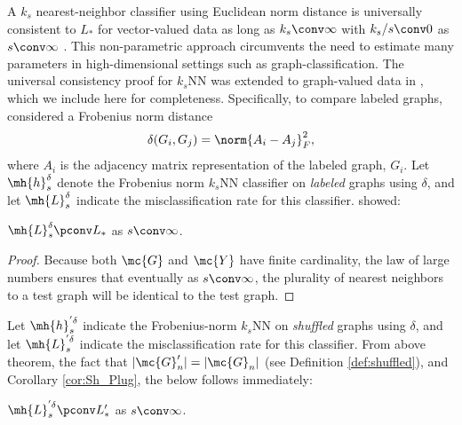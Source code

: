 \documentclass[10pt,journal,cspaper,compsoc]{IEEEtran}
\begin{document}
A $k_s$ nearest-neighbor classifier 
using Euclidean norm distance
is universally consistent to $L_*$ for vector-valued data 
as long as $k_s \conv \infty$ with $k_s/s \conv 0$ as $s \conv \infty$ \cite{Stone1977}. This non-parametric approach circumvents the need to estimate many parameters in high-dimensional settings such as graph-classification. The universal consistency proof for $k_s$NN was extended to graph-valued data in \cite{VP11_super}, which we include here for completeness.   Specifically, to compare labeled graphs, \cite{VP11_super} considered a Frobenius norm distance
\begin{align}
	\delta(G_i,G_j)=\norm{A_i-A_j}_F^2,
\end{align}
where $A_i$ is the adjacency matrix representation of the labeled graph, $G_i$.  
Let $\mh{h}_s^\delta$ denote the Frobenius norm $k_s$NN classifier on \emph{labeled} graphs using $\delta$, and let $\mh{L}^{\delta}_s$ indicate the misclassification rate for this classifier.  \cite{VP11_super} showed:
\begin{thm} \label{thm:5}
	$\mh{L}^{\delta}_s \pconv L_*$ as $s \conv \infty$.
\end{thm}
\begin{proof}
Because both $\mc{G}$ and $\mc{Y}$ have finite cardinality, the law of large numbers ensures that eventually as $s \conv \infty$, the plurality of nearest neighbors to a test graph will be identical to the test graph. 
\end{proof}
Let ${\mh{h}}^{'\delta}_s$ indicate the Frobenius-norm $k_s$NN on \emph{shuffled} graphs using $\delta$, and let $\mh{L}^{'\delta}_s$ indicate the misclassification rate for this classifier.  %
From above theorem, the fact that $|\mc{G}_n'|=|\mc{G}_n|$ (see Definition \ref{def:shuffled}), and Corollary \ref{cor:Sh_Plug},  the below follows immediately:
\begin{coro} \label{cor:knn1}
	$\mh{L}^{'\delta}_s \pconv L_*'$ as $s \conv \infty$.
\end{coro}
\end{document}
